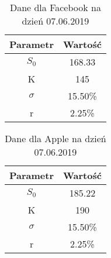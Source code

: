\documentclass[12pt]{article}
\begin{document}
\begin{table}[h!]
\caption{Dane dla Facebook na dzień 07.06.2019}
\centering
\begin{tabular}{|c|c|}
\hline                       
\textbf{Parametr} & \textbf{Wartość} \\
\hline
$S_0$&168.33\\
K&145\\
$\sigma$&15.50\%\\ %
r&2.25\%\\ %
\hline 
\end{tabular}
\label{tab:wycena_fb} 
\end{table}

\begin{table}[h!]
\caption{Dane dla Apple na dzień 07.06.2019}
\centering
\begin{tabular}{|c|c|}
\hline                       
\textbf{Parametr} & \textbf{Wartość} \\
\hline
$S_0$&185.22\\
K&190\\ %
$\sigma$&15.50\%\\ %
r&2.25\%\\ %
\hline 
\end{tabular}
\label{tab:wycena_apple} 
\end{table}
\end{document}
